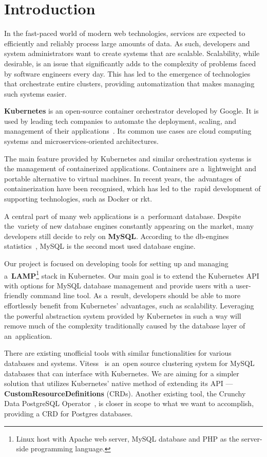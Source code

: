 \chapter{Introduction}
In the fast-paced world of modern web technologies, services are expected to
efficiently and reliably process large amounts of data. As such, developers
and system administrators want to create systems that are scalable. Scalability,
while desirable, is an issue that significantly adds to the complexity of
problems faced by software engineers every day. This has led to the emergence of
technologies that orchestrate entire clusters, providing automatization that
makes managing such systems easier.

\textbf{Kubernetes} is an open-source container orchestrator developed by
Google. It is used by leading tech companies to automate the deployment,
scaling, and management of their applications~\cite{kube-usecase}. Its common
use cases are cloud computing systems and microservices-oriented architectures.

The main feature provided by Kubernetes and similar orchestration
systems is the management of containerized applications. Containers are
a~lightweight and portable alternative to virtual machines. In recent years,
the~advantages of containerization have been recognised, which has led to
the~rapid development of supporting technologies, such as Docker or rkt.

A central part of many web applications is a~performant database. Despite
the~variety of new database engines constantly appearing on the market, many
developers still decide to rely on \textbf{MySQL}. According to the db-engines
statistics~\cite{db-eng}, MySQL is the second most used database
engine.

Our project is focused on developing tools for setting up and managing
a~\textbf{LAMP}\footnote{Linux host with Apache web server, MySQL database
and PHP as the server-side programming language.} stack in Kubernetes. Our main goal is to
extend the Kubernetes API with options for MySQL database
management and provide users with a user-friendly command line tool. As
a~result, developers should be able to more effortlessly benefit from
Kubernetes’ advantages, such as scalability. Leveraging the powerful
abstraction system provided by Kubernetes in such a way will remove
much of the complexity traditionally caused by the database layer of
an~application.

There are existing unofficial tools with similar functionalities for various
databases and systems. Vitess~\cite{vitess} is an~open source
clustering system for MySQL databases that can interface with
Kubernetes. We are aiming for a simpler solution that utilizes
Kubernetes' native method of extending its API ---
\textbf{CustomResourceDefinitions} (CRDs). Another existing tool,
the Crunchy Data PostgreSQL Operator~\cite{psql-op}, is closer in scope to what we want to
accomplish, providing a CRD for Postgres databases.

